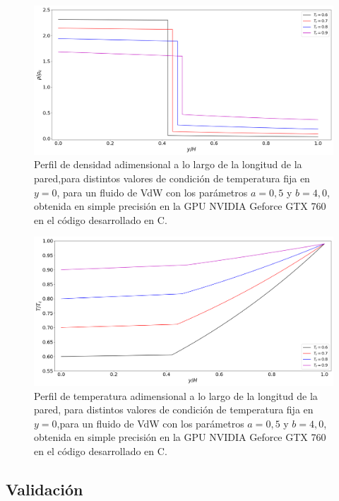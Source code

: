 \begin{figure}[htbp]
	\centering
	\includegraphics[width=\textwidth]{figs/cap4/VdW_val_rho_y}
	\caption{Perfil de densidad adimensional a lo largo de la longitud de la pared,para distintos valores de condición de temperatura fija en $y = 0$, para un fluido de VdW con los parámetros $a = 0,5 $ y $b = 4,0 $, obtenida en simple precisión en la GPU NVIDIA Geforce GTX 760 en el código desarrollado en \textsc{C}.} 
	\label{fig:VdW_val_rho_y}	
\end{figure}

\begin{figure}[htbp]
	\centering
	\includegraphics[width=\textwidth]{figs/cap4/VdW_val_T_y}
	\caption{Perfil de temperatura adimensional a lo largo de la longitud de la pared, para distintos valores de condición de temperatura fija en $y = 0$,para un fluido de VdW con los parámetros $a = 0,5 $ y $b = 4,0 $, obtenida en simple precisión en la GPU NVIDIA Geforce GTX 760 en el código desarrollado en \textsc{C}.} 
	\label{fig:VdW_val_T_y}	
\end{figure}

\newpage

\subsection{Validación}

